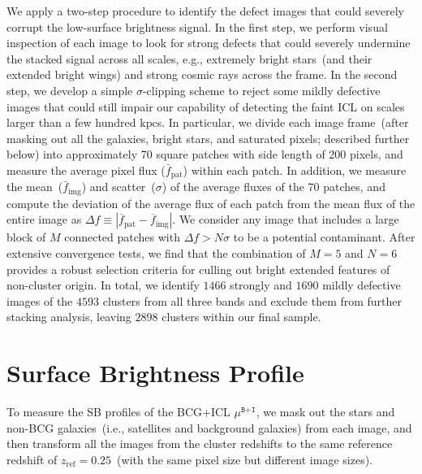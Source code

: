 \documentclass[fleqn,usenatbib]{mnras}
\newcommand{\mubi}{\mu^{\texttt{B+I}}}
\newcommand{\kpc}{\mathrm{kpc}}
\begin{document}
We apply a two-step procedure to identify the defect images that
could severely corrupt the low-surface brightness signal. In the first
step, we perform visual inspection of each image to look for strong defects
that could severely undermine the stacked signal across all scales, e.g.,
extremely bright stars~(and their extended bright wings) and strong cosmic
rays across the frame. In the second step, we develop a simple
$\sigma$-clipping scheme to reject some mildly defective images that could
still impair our capability of detecting the faint ICL on scales larger
than a few hundred $\kpc$s. In particular, we divide each image
frame~(after masking out all the galaxies, bright stars, and saturated
pixels; described further below) into approximately 70
square patches with side length of 200 pixels, and measure the average pixel
flux ($\bar{f}_{\mathrm{pat}}$) within each patch. In addition, we measure
the mean~($\bar{f}_{\mathrm{img}}$) and scatter~($\sigma$) of the average
fluxes of the 70 patches, and compute the deviation of the average flux of
each patch from the mean flux of the entire image as $\Delta
f{\equiv}|\overline{f}_{\mathrm{pat}}{-}\overline{f}_{\mathrm{img}}|$. We
consider any image that includes a large block of $M$ connected patches
with $\Delta f{>}N \sigma$ to be a potential contaminant. After extensive
convergence tests, we find that the combination of $M{=}5$ and $N{=}6$
provides a robust selection criteria for culling out bright extended
features of non-cluster origin.  In total, we identify $1466$ strongly and
$1690$ mildly defective images of the $4593$ clusters from all three bands
and exclude them from further stacking analysis, leaving $2898$ clusters
within our final sample.



\section{Surface Brightness Profile}
\label{sec:sb}



To measure the SB profiles of the BCG+ICL $\mubi$, we mask out
the stars and non-BCG galaxies~(i.e., satellites and background
galaxies) from each image, and then transform all the images from the
cluster redshifts to the same reference redshift of
$z_{\mathrm{ref}}{=}0.25$~(with the same pixel size but different image
sizes).
\end{document}
